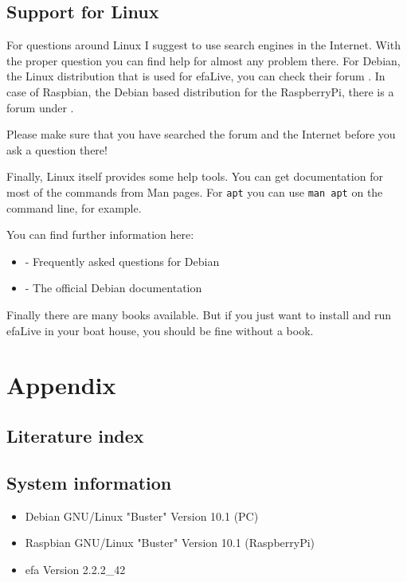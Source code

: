 \documentclass[a4paper,12pt,twoside]{article}
\begin{document}
\subsection{Support for Linux}
\label{support_linux}
For questions around Linux I suggest to use search engines in the
Internet. With the proper question you can find help for almost any
problem there. For Debian, the Linux distribution that is used for
efaLive, you can check their forum \cite{HLP1}. In case of Raspbian, 
the Debian based distribution for the RaspberryPi, there is a forum 
under \cite{RSP1}.

Please make sure that
you have searched the forum and the Internet before you ask a question
there!

Finally, Linux itself provides some help tools. You can get
documentation for most of the commands from Man pages. For
\texttt{apt} you can use \texttt{man
apt} on the command line, for example.

You can find further information here:

\begin{itemize}
    \item \cite{HLP2} - Frequently asked questions for Debian
    \item \cite{HLP3} - The official Debian documentation
\end{itemize}

Finally there are many books available. But if you just want to install
and run efaLive in your boat house, you should be fine without a book.


\clearpage
\section{Appendix}
\label{sct:appendix}
\subsection{Literature index}
\label{sct:literature}




\subsection{System information}
\label{sct:sysinfo}

\begin{itemize}
    \item Debian GNU/Linux "Buster" Version 10.1 (PC)
    \item Raspbian GNU/Linux "Buster" Version 10.1 (RaspberryPi)
    \item efa Version 2.2.2\_42
\end{itemize}
\end{document}
